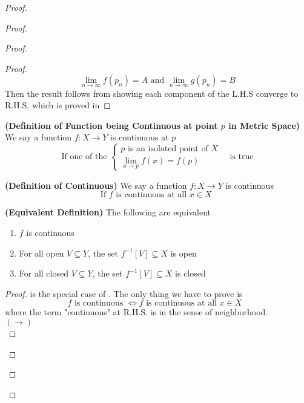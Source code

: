 \documentclass{report}
\begin{document}
\begin{proof}
\begin{proof}
\begin{proof}
\begin{proof}
 \begin{equation*}
\lim_{n\to\infty}f(p_n)=A\text{ and }\lim_{n\to\infty}g(p_n)=B
\end{equation*}
Then the result follows from showing each component of the L.H.S converge to R.H.S, which is proved in 
\end{proof}
\begin{definition}
\label{5.1.5}
\textbf{(Definition of Function being Continuous at point $p$ in Metric Space)} We say a function $f:X\rightarrow Y$ is continuous at $p$ 
\begin{equation*}
\text{ If one of the }\begin{cases}
p \text{ is an isolated point of $X$ }\\
\lim_{x\to p}f(x)=f(p)
\end{cases}\text{ is true }
\end{equation*}
\end{definition}
\begin{definition}
\label{5.1.6}
\textbf{(Definition of Continuous)} We say a function $f:X\rightarrow Y$ is continuous 
\begin{equation*}
\text{ If }f\text{ is continuous at all $x\in X$ }
\end{equation*}
\end{definition}
\begin{theorem}
\label{5.1.7}
\textbf{(Equivalent Definition)} The following are equivalent
\begin{enumerate}[label=(\alph*)]
  \item $f$ is continuous 
  \item For all open $V\subseteq Y$, the set $f^{-1}[V]\subseteq X$ is open
\item For all closed $V\subseteq Y$, the set $f^{-1}[V]\subseteq X$ is closed\\
\end{enumerate}
\end{theorem}
\begin{proof}
 is the special case of . The only thing we have to prove is 
\begin{equation*}
f\text{ is continuous }\iff  f\text{ is continuous at all $x\in X$ }
\end{equation*}
where the term "continuous" at R.H.S. is in the sense of neighborhood.\\

$(\longrightarrow)$\\


\end{proof}
\end{proof}
\end{proof}
\end{proof}
\end{document}
